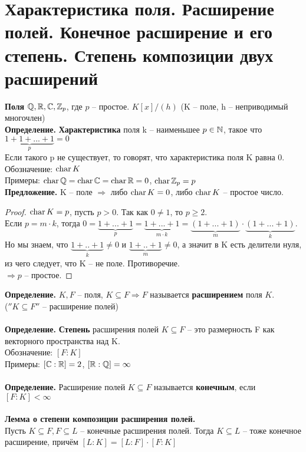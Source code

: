\section{Характеристика поля. Расширение полей. Конечное расширение и его степень. Степень композиции двух расширений}

\textbf{Поля} $\mathbb{Q}, \mathbb{R}, \mathbb{C}, \mathbb{Z}_p$, где $p$ -- простое. $K[x]/(h)$ (K -- поле, h -- неприводимый многочлен)\\
\textbf{Определение.} \textbf{Характеристика} поля k -- наименьшее $p\in \mathbb{N}$, такое что $\underbrace{1+1+...+1}_{p}=0$\\
Если такого p не существует, то говорят, что характеристика поля K равна 0.\\
Обозначение: $\operatorname{char} K$\\
Примеры: $\operatorname{char}\mathbb{Q}=\operatorname{char}\mathbb{C}=\operatorname{char}\mathbb{R}=0$, $\operatorname{char}\mathbb{Z}_p=p$\\
\textbf{Предложение.} K -- поле $\Rightarrow$ либо $\operatorname{char} K=0$, либо $\operatorname{char} K$ -- простое число.
\begin{proof}
    $\operatorname{char} K = p$, пусть $p> 0$. Так как $0\neq 1$, то $p\geqslant 2$.\\
    Если $p=m\cdot k$, тогда $0=\underbrace{1+...+1}_{p}=\underbrace{1+...+1}_{m\cdot k}=\underbrace{(1+...+1)}_{m}\cdot\underbrace{(1+...+1)}_{k}$. Но мы знаем, что $\underbrace{1+..+1}_{k}\neq 0$ и $\underbrace{1+..+1}_{m}\neq 0$, а значит в K есть делители нуля, из чего следует, что K -- не поле. Противоречие.\\
    $\Rightarrow p$ -- простое.
\end{proof}
\noindent \textbf{Определение.} $K, F$ -- поля, $K\subseteq F\Rightarrow F$ называется \textbf{расширением} поля $K$.\\ ($''K\subseteq F''$ -- расширение полей)\\\\
\textbf{Определение.} \textbf{Степень} расширения полей $K\subseteq F$ -- это размерность F как векторного пространства над K.\\
Обозначение: $[F:K]$\\
Примеры: $[\mathbb{C}:\mathbb{R}]=2$, $[\mathbb{R}:\mathbb{Q}]=\infty$\\\\
\textbf{Определение.} Расширение полей $K\subseteq F$ называется \textbf{конечным}, если $[F:K]<\infty$\\\\
\textbf{Лемма о степени композиции расширения полей.}\\
Пусть $K\subseteq F, F\subseteq L$ -- конечные расширения полей. Тогда $K\subseteq L$ -- тоже конечное расширение, причём $[L:K]=[L:F]\cdot[F:K]$
